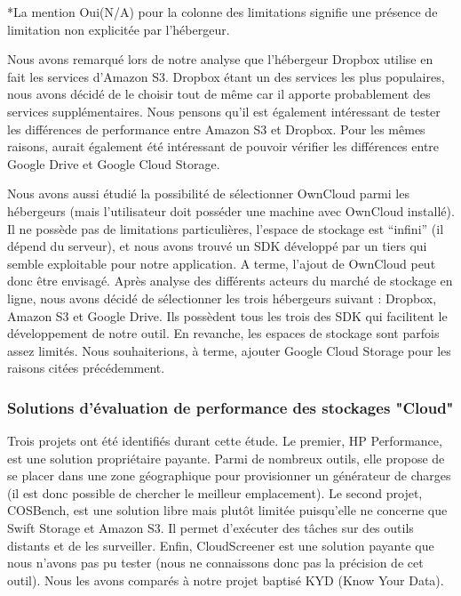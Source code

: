 \documentclass[10pt]{article}
\begin{document}
*La mention Oui(N/A) pour la colonne des limitations signifie une
présence de limitation non explicitée par l'hébergeur.

Nous avons remarqué lors de notre analyse que l’hébergeur Dropbox
utilise en fait les services d'Amazon S3. Dropbox étant un des
services les plus populaires, nous avons décidé de le choisir tout de
même car il apporte probablement des services supplémentaires. Nous
pensons qu’il est également intéressant de tester les différences de
performance entre Amazon S3 et Dropbox. Pour les mêmes raisons, aurait
également été intéressant de pouvoir vérifier les différences entre
Google Drive et Google Cloud Storage.

Nous avons aussi étudié la possibilité de sélectionner OwnCloud parmi
les hébergeurs (mais l’utilisateur doit posséder une machine avec
OwnCloud installé). Il ne possède pas de limitations particulières,
l’espace de stockage est “infini” (il dépend du serveur), et nous
avons trouvé un SDK développé par un tiers qui semble exploitable pour
notre application. A terme, l’ajout de OwnCloud peut donc être
envisagé. Après analyse des différents acteurs du marché de stockage
en ligne, nous avons décidé de sélectionner les trois hébergeurs
suivant : Dropbox, Amazon S3 et Google Drive. Ils possèdent tous les
trois des SDK qui facilitent le développement de notre outil. En
revanche, les espaces de stockage sont parfois assez limités. Nous
souhaiterions, à terme, ajouter Google Cloud Storage pour les raisons
citées précédemment.

\subsubsection{Solutions d'évaluation de performance des stockages "Cloud"}

Trois projets ont été identifiés durant cette étude. Le premier, HP
Performance, est une solution propriétaire payante. Parmi de nombreux
outils, elle propose de se placer dans une zone géographique pour
provisionner un générateur de charges (il est donc possible de
chercher le meilleur emplacement). Le second projet, COSBench, est une
solution libre mais plutôt limitée puisqu’elle ne concerne que Swift
Storage et Amazon S3. Il permet d'exécuter des tâches sur des outils
distants et de les surveiller. Enfin, CloudScreener est une solution
payante que nous n’avons pas pu tester (nous ne connaissons donc pas
la précision de cet outil). Nous les avons comparés à notre projet
baptisé KYD (Know Your Data).
\newpage
\end{document}
